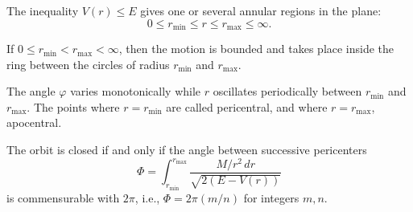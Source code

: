 The inequality $V(r) \leq E$ gives one or several annular regions in the plane:
$$0 \leq r_{\min} \leq r \leq r_{\max} \leq \infty.$$

If $0 \leq r_{\min} < r_{\max} < \infty$, then the motion is bounded and takes place inside the ring between the circles of radius $r_{\min}$ and $r_{\max}$.

The angle $\varphi$ varies monotonically while $r$ oscillates periodically between $r_{\min}$ and $r_{\max}$. The points where $r = r_{\min}$ are called pericentral, and where $r = r_{\max}$, apocentral.

The orbit is closed if and only if the angle between successive pericenters
$$\Phi = \int_{r_{\min}}^{r_{\max}} \frac{M/r^2 \, dr}{\sqrt{2(E - V(r))}}$$
is commensurable with $2\pi$, i.e., $\Phi = 2\pi(m/n)$ for integers $m, n$.
